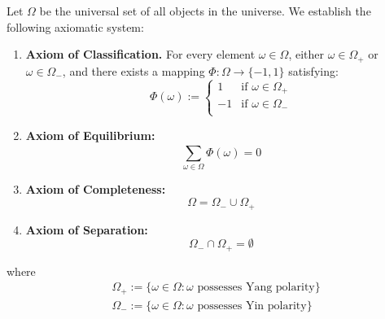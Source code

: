 \documentclass[a4paper,14pt, twoside]{memoir}
\begin{document}
Let $\Omega$ be the universal set of all objects in the universe. We establish the following axiomatic system:
\begin{enumerate}
	\item \textbf{Axiom of Classification.} For every element $\omega \in \Omega$, either $\omega \in \Omega_+$ or $\omega \in \Omega_-$, and there exists a mapping $\Phi : \Omega \to \{-1,1\}$ satisfying:
	      $$\Phi(\omega) := \begin{cases}
			      1 & \text{if } \omega \in \Omega_+  \\
			      -1 & \text{if } \omega \in \Omega_- \\
		      \end{cases}
	      $$
	\item \textbf{Axiom of Equilibrium:} \[
		      \sum_{\omega \in \Omega}^{}{\Phi(\omega)} = 0
	      \]
	\item \textbf{Axiom of Completeness:} \[\Omega = \Omega_- \cup \Omega_+\]
	\item \textbf{Axiom of Separation:} \[\Omega_- \cap \Omega_+ = \emptyset\]

\end{enumerate}
where
\begin{align*}
	 & \Omega_+:= \{\omega \in \Omega : \omega \text{ possesses Yang polarity}\} \\
	 & \Omega_-:= \{\omega \in \Omega : \omega \text{ possesses Yin polarity}\}    \\
\end{align*}
\end{document}
